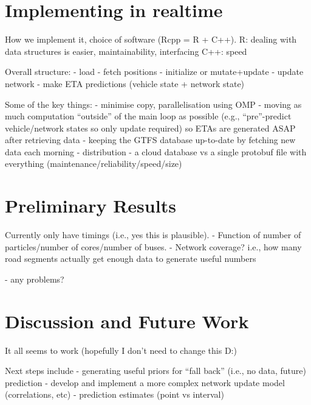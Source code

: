 \documentclass[times, doublespace]{anzsauth}
\begin{document}
\section{Implementing in realtime}
\label{sec:rt}

How we implement it, choice of software (Rcpp = R + C++).
R: dealing with data structures is easier, maintainability, interfacing
C++: speed

Overall structure:
- load
- fetch positions
- initialize or mutate+update
- update network
- make ETA predictions (vehicle state + network state)

Some of the key things:
- minimise copy, parallelisation using OMP
- moving as much computation ``outside'' of the main loop as possible
  (e.g., ``pre''-predict vehicle/network states so only update required)
  so ETAs are generated ASAP after retrieving data
- keeping the GTFS database up-to-date by fetching new data each morning
- distribution - a cloud database vs a single protobuf file with everything 
  (maintenance/reliability/speed/size)


\section{Preliminary Results}
\label{sec:results}

Currently only have timings (i.e., yes this is plausible).
- Function of number of particles/number of cores/number of buses.
- Network coverage? i.e., how many road segments actually get enough data
to generate useful numbers

- any problems?


\section{Discussion and Future Work}
\label{sec:discussion}

It all seems to work (hopefully I don't need to change this D:)

Next steps include
- generating useful priors for ``fall back'' (i.e., no data, future) prediction
- develop and implement a more complex network update model (correlations, etc)
- prediction estimates (point vs interval)

\cite{Hans_2015}




\end{document}
